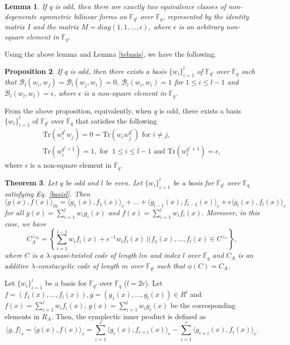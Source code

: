 \documentclass[12 pt]{extarticle}
\numberwithin{equation}{section}
\newtheorem{theorem}{Theorem}[section]
\newtheorem{proposition}[theorem]{Proposition}
\newtheorem{lemma}[theorem]{Lemma}
\theoremstyle{definition}
\begin{document}
\begin{lemma}\cite{Artin1957}
    If $q$ is odd, then there are exactly two equivalence classes of non-degenerate symmetric bilinear forms on $\mathbb{F}_{q^l}$ over $\mathbb{F}_q$, represented by the identity matrix $I$ and the matrix $M=diag(1,1,\dots,\epsilon)$, where $\epsilon$ is an arbitrary non-square element in $\mathbb{F}_q$.
\end{lemma}
Using the above lemma and Lemma \ref{tebasis}, we have the following. 

 \begin{proposition}
    If $q$ is odd, then there exists a basis $\{w_i\}_{i=1}^l$ of $\mathbb{F}_{q^l}$ over $\mathbb{F}_q$ such that $\mathcal{B}_l(w_i,w_j)=\mathcal{B}_l(w_j,w_i)=0$, $\mathcal{B}_l(w_i,w_i)=1$ for $1\leq i\leq l-1$ and $\mathcal{B}_l(w_l,w_l)=\epsilon$, where $\epsilon$ is a non-square element in $\mathbb{F}_q$.  
 \end{proposition}

 From the above proposition, equivalently, when $q$ is odd, there exists a basis $\{w_i\}_{i=1}^l$ of $\mathbb{F}_{q^l}$ over $\mathbb{F}_q$ that satisfies the following
 \begin{equation}\label{basisl}
 \begin{split}
     \text{Tr}(w_i^{q^r}w_j)=0= \text{Tr}(w_iw_j^{q^r}) \text{ for } i\neq j, \\  \text{Tr}(w_i^{q^r+1})=1, \text{ for } \ 1\leq i\leq l-1 \text{ and Tr}(w_l^{q^r+1})=\epsilon,
      \end{split}
 \end{equation}
where $\epsilon$ is a non-square element in $\mathbb{F}_q$.
\begin{theorem}
    Let $q$ be odd and $l$ be even. Let $\{w_i\}_{i=1}^l$ be a basis for $\mathbb{F}_{q^l}$ over $\mathbb{F}_q$ satisfying Eq. \ref{basisl}. Then
 $$\langle g(x),f(x)\rangle_{th}=\langle g_1(x),f_1(x)\rangle_e+\dots+\langle g_{l-1}(x),f_{l-1}(x)\rangle_e+\epsilon \langle g_l(x),f_l(x)\rangle_e$$
 for all $g(x)=\sum_{i=1}^lw_ig_i(x)$ and $f(x)=\sum_{i=1}^lw_if_i(x)$. Moreover, in this case, we have  $$C_A^{\perp_{th}}=\left \{\sum_{i=1}^{l-1}w_if_i(x)+\epsilon^{-1}w_lf_l(x)\ | (f_1(x),\dots,f_l(x)\in C^{\perp_e}\right \},$$
where $C$ is a $\lambda$-quasi-twisted code of length $lm$ and index $l$ over $\mathbb{F}_q$ and $C_A$ is an additive $\lambda$-constacyclic code of length $m$ over $\mathbb{F}_{q^l}$ such that  $\phi(C)=C_A$.
\end{theorem}

 Let $\{w_i\}_{i=1}^l$ be a basis for $\mathbb{F}_{q^l}$ over $\mathbb{F}_q$ ($l=2r$). Let $f=(f_1(x),\dots,f_l(x)),g=(g_1(x),\dots,g_l(x))\in R^l$ and $f(x)=\sum_{i=1}^l w_if_i(x)$, $g(x)=\sum_{i=1}^l w_ig_i(x)$ be the corresponding elements in $R_A$. Then, the symplectic inner product is defined as
 $$\langle g,f\rangle_s=\langle g(x),f(x)\rangle_s=\sum_{i=1}^r\langle g_i(x),f_{r+i}(x)\rangle_e-\sum_{i=1}^r\langle g_{r+i}(x),f_i(x)\rangle_e.$$
\end{document}
